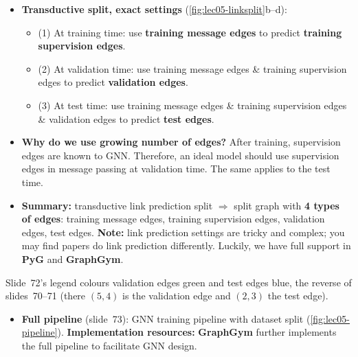 \begin{itemize}
\begin{itemize}
        in all dataset splits. But since edges are both part of graph structure
        and the supervision, we need to \textbf{hold out validation / test
        edges}.
      \item To train the training set, we further need to \textbf{hold out
        supervision edges for the training set}.
    \end{itemize}
  \item \textbf{Transductive split, exact settings}
    (\cref{fig:lec05-linksplit}b--d):
    \begin{itemize}
      \item (1) At training time: use \textbf{training message edges} to predict
        \textbf{training supervision edges}.
      \item (2) At validation time: use training message edges \& training
        supervision edges to predict \textbf{validation edges}.
      \item (3) At test time: use training message edges \& training
        supervision edges \& validation edges to predict \textbf{test edges}.
    \end{itemize}
  \item \textbf{Why do we use growing number of edges?} After training,
    supervision edges are known to GNN. Therefore, an ideal model should use
    supervision edges in message passing at validation time. The same applies
    to the test time.
  \item \textbf{Summary:} transductive link prediction split $\Rightarrow$
    split graph with \textbf{4 types of edges}: training message edges,
    training supervision edges, validation edges, test edges. \textbf{Note:}
    link prediction settings are tricky and complex; you may find papers do
    link prediction differently. Luckily, we have full support in \textbf{PyG}
    and \textbf{GraphGym}.
\end{itemize}
\begin{caution}
  Slide~72's legend colours validation edges green and test edges blue, the
  reverse of slides~70--71 (there $(5,4)$ is the validation edge and $(2,3)$
  the test edge).
\end{caution}
\begin{itemize}
  \item \textbf{Full pipeline} (slide~73): GNN training pipeline with dataset
    split (\cref{fig:lec05-pipeline}). \textbf{Implementation resources:}
    \textbf{GraphGym} further implements the full pipeline to facilitate GNN
    design.
\end{itemize}

